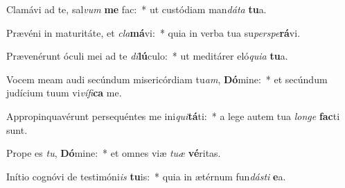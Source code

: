 \item Clamávi ad te, sal\textit{vum} \textbf{me} fac:~* ut custódiam man\textit{dá}\textit{ta} \textbf{tu}a.
\item Prævéni in maturitáte, et \textit{cla}\textbf{má}vi:~* quia in verba tua su\textit{per}\textit{spe}\textbf{rá}vi.
\item Prævenérunt óculi mei ad te \textit{di}\textbf{lú}culo:~* ut meditárer eló\textit{qui}\textit{a} \textbf{tu}a.
\item Vocem meam audi secúndum misericórdiam tu\textit{am}, \textbf{Dó}mine:~* et secúndum judícium tuum vi\textit{ví}\textit{fi}\textbf{ca} me.
\item Appropinquavérunt persequéntes me ini\textit{qui}\textbf{tá}ti:~* a lege autem tua \textit{lon}\textit{ge} \textbf{fac}ti sunt.
\item Prope es \textit{tu}, \textbf{Dó}mine:~* et omnes viæ \textit{tu}\textit{æ} \textbf{vé}ritas.
\item Inítio cognóvi de testimóni\textit{is} \textbf{tu}is:~* quia in ætérnum fun\textit{dás}\textit{ti} \textbf{e}a.

